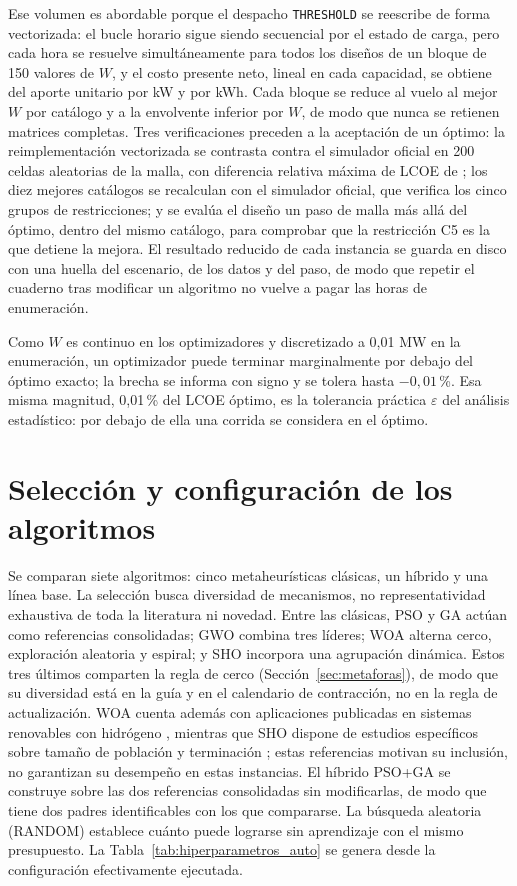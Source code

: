 Ese volumen es abordable porque el despacho \texttt{THRESHOLD} se reescribe de forma vectorizada: el bucle horario sigue siendo secuencial por el estado de carga, pero cada hora se resuelve simultáneamente para todos los diseños de un bloque de 150 valores de $W$, y el costo presente neto, lineal en cada capacidad, se obtiene del aporte unitario por kW y por kWh. Cada bloque se reduce al vuelo al mejor $W$ por catálogo y a la envolvente inferior por $W$, de modo que nunca se retienen matrices completas. Tres verificaciones preceden a la aceptación de un óptimo: la reimplementación vectorizada se contrasta contra el simulador oficial en 200 celdas aleatorias de la malla, con diferencia relativa máxima de LCOE de \MaxControlRelDiff{}; los diez mejores catálogos se recalculan con el simulador oficial, que verifica los cinco grupos de restricciones; y se evalúa el diseño un paso de malla más allá del óptimo, dentro del mismo catálogo, para comprobar que la restricción C5 es la que detiene la mejora. El resultado reducido de cada instancia se guarda en disco con una huella del escenario, de los datos y del paso, de modo que repetir el cuaderno tras modificar un algoritmo no vuelve a pagar las horas de enumeración.

Como $W$ es continuo en los optimizadores y discretizado a 0,01 MW en la enumeración, un optimizador puede terminar marginalmente por debajo del óptimo exacto; la brecha se informa con signo y se tolera hasta $-0{,}01$\,\%. Esa misma magnitud, 0,01\,\% del LCOE óptimo, es la tolerancia práctica $\varepsilon$ del análisis estadístico: por debajo de ella una corrida se considera en el óptimo.

\section{Selección y configuración de los algoritmos}
\label{sec:seleccion_algoritmos}

Se comparan siete algoritmos: cinco metaheurísticas clásicas, un híbrido y una línea base. La selección busca diversidad de mecanismos, no representatividad exhaustiva de toda la literatura ni novedad. Entre las clásicas, PSO y GA actúan como referencias consolidadas; GWO combina tres líderes; WOA alterna cerco, exploración aleatoria y espiral; y SHO incorpora una agrupación dinámica. Estos tres últimos comparten la regla de cerco (Sección~\ref{sec:metaforas}), de modo que su diversidad está en la guía y en el calendario de contracción, no en la regla de actualización. WOA cuenta además con aplicaciones publicadas en sistemas renovables con hidrógeno \cite{Sun2022WOA}, mientras que SHO dispone de estudios específicos sobre tamaño de población y terminación \cite{Vega2022SHO}; estas referencias motivan su inclusión, no garantizan su desempeño en estas instancias. El híbrido PSO+GA se construye sobre las dos referencias consolidadas sin modificarlas, de modo que tiene dos padres identificables con los que compararse. La búsqueda aleatoria (RANDOM) establece cuánto puede lograrse sin aprendizaje con el mismo presupuesto. La Tabla~\ref{tab:hiperparametros_auto} se genera desde la configuración efectivamente ejecutada.

